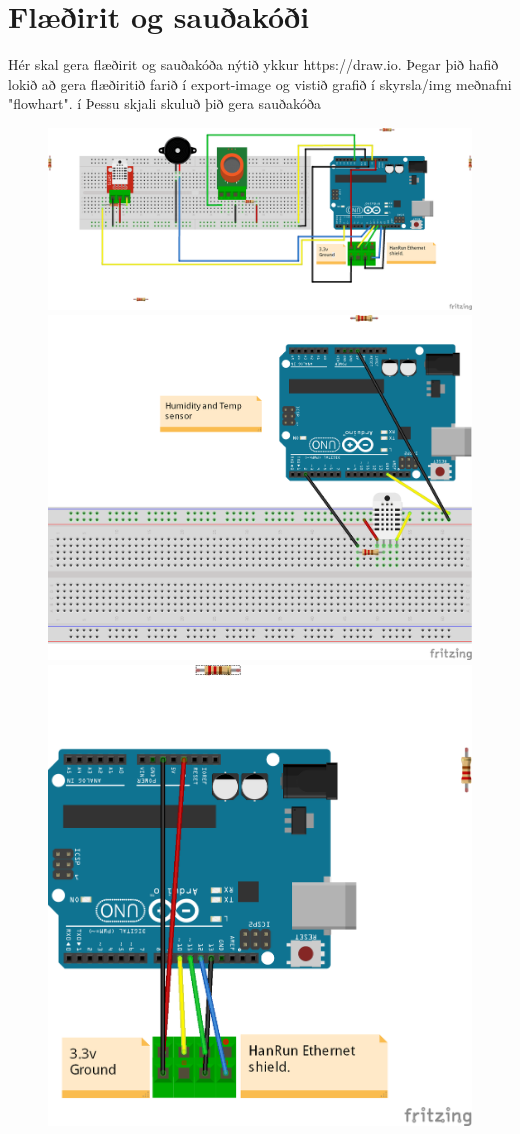 \section{Flæðirit og sauðakóði}Hér skal gera flæðirit og sauðakóða nýtið ykkur https://draw.io. Þegar þið hafið lokið að gera flæðiritið farið í export-image og vistið grafið í skyrsla/img meðnafni "flowhart". í Þessu skjali skuluð þið gera sauðakóða 
\begin{figure}[h]
\includegraphics[scale=.4]{img/project}
\includegraphics[scale=.4]{img/Humi_temp_bb} 
\includegraphics[scale=.5]{img/ethernet2}
\end{figure}
